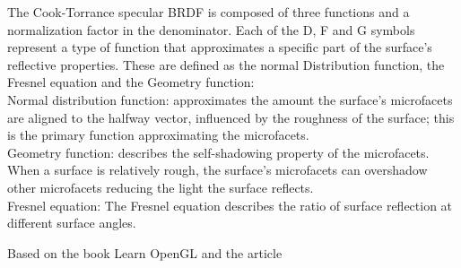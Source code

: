 The Cook-Torrance specular BRDF is composed of three functions and a normalization factor in the denominator. Each of the D, F and G symbols represent a type of function that approximates a specific part of the surface's reflective properties. These are defined as the normal Distribution function, the Fresnel equation and the Geometry function:\\
Normal distribution function: approximates the amount the surface's microfacets are aligned to the halfway vector, influenced by the roughness of the surface; this is the primary function approximating the microfacets.\\
Geometry function: describes the self-shadowing property of the microfacets. When a surface is relatively rough, the surface's microfacets can overshadow other microfacets reducing the light the surface reflects.\\
Fresnel equation: The Fresnel equation describes the ratio of surface reflection at different surface angles.

Based on the book Learn OpenGL \cite{learnopengl} and the article \cite{pbrreferences}